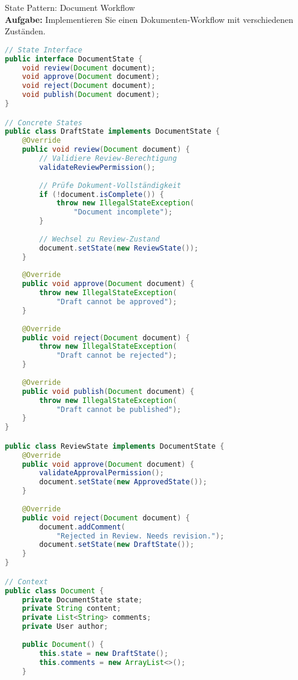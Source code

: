 \begin{example2}{State Pattern: Document Workflow}\\
\textbf{Aufgabe:} Implementieren Sie einen Dokumenten-Workflow mit verschiedenen Zuständen.

\begin{lstlisting}[language=Java, style=basesmol]
// State Interface
public interface DocumentState {
    void review(Document document);
    void approve(Document document);
    void reject(Document document);
    void publish(Document document);
}

// Concrete States
public class DraftState implements DocumentState {
    @Override
    public void review(Document document) {
        // Validiere Review-Berechtigung
        validateReviewPermission();
        
        // Prüfe Dokument-Vollständigkeit
        if (!document.isComplete()) {
            throw new IllegalStateException(
                "Document incomplete");
        }
        
        // Wechsel zu Review-Zustand
        document.setState(new ReviewState());
    }
    
    @Override
    public void approve(Document document) {
        throw new IllegalStateException(
            "Draft cannot be approved");
    }
    
    @Override
    public void reject(Document document) {
        throw new IllegalStateException(
            "Draft cannot be rejected");
    }
    
    @Override
    public void publish(Document document) {
        throw new IllegalStateException(
            "Draft cannot be published");
    }
}

public class ReviewState implements DocumentState {
    @Override
    public void approve(Document document) {
        validateApprovalPermission();
        document.setState(new ApprovedState());
    }
    
    @Override
    public void reject(Document document) {
        document.addComment(
            "Rejected in Review. Needs revision.");
        document.setState(new DraftState());
    }
}

// Context
public class Document {
    private DocumentState state;
    private String content;
    private List<String> comments;
    private User author;
    
    public Document() {
        this.state = new DraftState();
        this.comments = new ArrayList<>();
    }
    

\end{lstlisting}
\end{example2}
